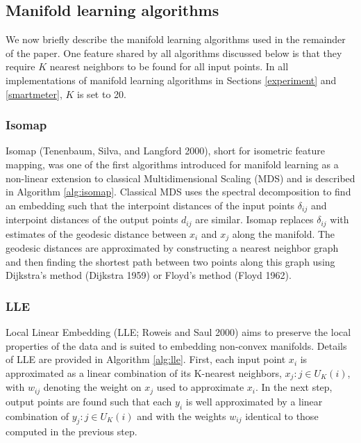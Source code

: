 \documentclass[12pt]{article}
\begin{document}
\hypertarget{ml}{%
\subsection{Manifold learning algorithms}\label{ml}}

We now briefly describe the manifold learning algorithms used in the remainder of the paper. One feature shared by all algorithms discussed below is that they require \(K\) nearest neighbors to be found for all input points. In all implementations of manifold learning algorithms in Sections \ref{experiment} and \ref{smartmeter}, \(K\) is set to 20.

\hypertarget{isomap}{%
\subsubsection*{Isomap}\label{isomap}}

Isomap (Tenenbaum, Silva, and Langford 2000), short for isometric feature mapping, was one of the first algorithms introduced for manifold learning as a non-linear extension to classical Multidimensional Scaling (MDS) and is described in Algorithm \ref{alg:isomap}. Classical MDS uses the spectral decomposition to find an embedding such that the interpoint distances of the input points \(\delta_{ij}\) and interpoint distances of the output points \(d_{ij}\) are similar. Isomap replaces \(\delta_{ij}\) with estimates of the geodesic distance between \(x_i\) and \(x_j\) along the manifold. The geodesic distances are approximated by constructing a nearest neighbor graph and then finding the shortest path between two points along this graph using Dijkstra's method (Dijkstra 1959) or Floyd's method (Floyd 1962).

\hypertarget{lle}{%
\subsubsection*{LLE}\label{lle}}

Local Linear Embedding (LLE; Roweis and Saul 2000) aims to preserve the local properties of the data and is suited to embedding non-convex manifolds. Details of LLE are provided in Algorithm \ref{alg:lle}. First, each input point \(x_i\) is approximated as a linear combination of its K-nearest neighbors, \(x_j:j\in U_K(i)\), with \(w_{ij}\) denoting the weight on \(x_j\) used to approximate \(x_i\). In the next step, output points are found such that each \(y_i\) is well approximated by a linear combination of \(y_j:j\in U_K(i)\) and with the weights \(w_{ij}\) identical to those computed in the previous step.
\end{document}
